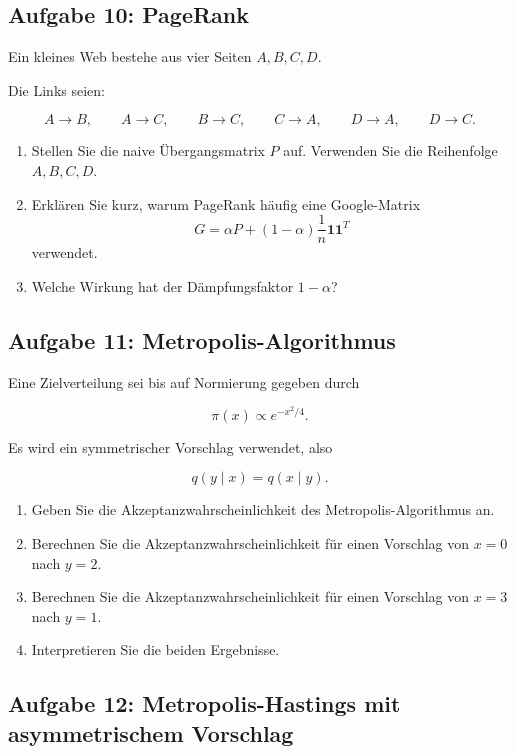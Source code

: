 \documentclass[11pt,a4paper]{article}
\begin{document}
\subsection*{Aufgabe 10: PageRank}

Ein kleines Web bestehe aus vier Seiten $A,B,C,D$.

Die Links seien:

\[
A \to B,
\qquad
A \to C,
\qquad
B \to C,
\qquad
C \to A,
\qquad
D \to A,
\qquad
D \to C.
\]

\begin{enumerate}
    \item Stellen Sie die naive Übergangsmatrix $P$ auf. Verwenden Sie die Reihenfolge $A,B,C,D$.
    \item Erklären Sie kurz, warum PageRank häufig eine Google-Matrix
    \[
    G = \alpha P + (1-\alpha)\frac{1}{n}\mathbf{1}\mathbf{1}^T
    \]
    verwendet.
    \item Welche Wirkung hat der Dämpfungsfaktor $1-\alpha$?
\end{enumerate}

\subsection*{Aufgabe 11: Metropolis-Algorithmus}

Eine Zielverteilung sei bis auf Normierung gegeben durch

\[
\pi(x) \propto e^{-x^2/4}.
\]

Es wird ein symmetrischer Vorschlag verwendet, also

\[
q(y \mid x) = q(x \mid y).
\]

\begin{enumerate}
    \item Geben Sie die Akzeptanzwahrscheinlichkeit des Metropolis-Algorithmus an.
    \item Berechnen Sie die Akzeptanzwahrscheinlichkeit für einen Vorschlag von $x=0$ nach $y=2$.
    \item Berechnen Sie die Akzeptanzwahrscheinlichkeit für einen Vorschlag von $x=3$ nach $y=1$.
    \item Interpretieren Sie die beiden Ergebnisse.
\end{enumerate}

\subsection*{Aufgabe 12: Metropolis-Hastings mit asymmetrischem Vorschlag}
\end{document}
